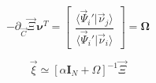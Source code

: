 \documentclass[aps,12pt]{revtex4}
\begin{document}
\begin{equation}
	- \partial_{\vec{C}}\vec{\Xi} \, \bm{\nu}^T = 
	\begin{bmatrix}
		 \dfrac{\langle \vec{\Psi}_i' \vert \vec{\nu}_j \rangle}{\langle \vec{\Psi}_i' \vert \vec{\nu}_i \rangle} 	
	\end{bmatrix}
	 = \bm{\Omega}
\end{equation}

\begin{equation}
	\vec{\xi} \simeq \left[ \alpha \bm{I}_N + \Omega \right]^{-1} \vec{\Xi}
\end{equation}




 
\end{document}

